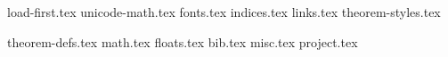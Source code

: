 
{load-first.tex}
{unicode-math.tex}
{fonts.tex}
{indices.tex}
{links.tex}
{theorem-styles.tex}
\theoremstyle{it}
{theorem-defs.tex}
{math.tex}
{floats.tex}
{bib.tex}
{misc.tex}
{project.tex}
